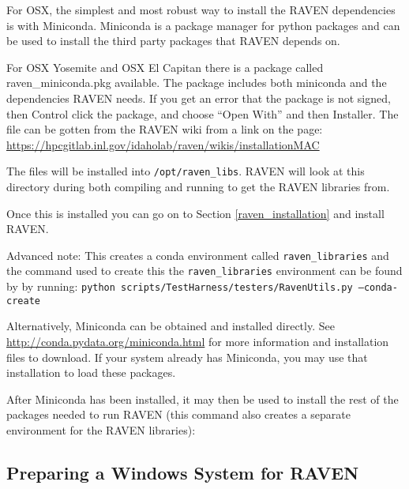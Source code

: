 For OSX, the simplest and most robust way to install the RAVEN
dependencies is with Miniconda.  Miniconda is a package manager for
python packages and can be used to install the third party packages
that RAVEN depends on.

For OSX Yosemite and OSX El Capitan there is a package called
raven\_miniconda.pkg available.  The package includes both miniconda
and the dependencies RAVEN needs. If you get an error that the package
is not signed, then Control click the package, and choose ``Open
With'' and then Installer.  The file can be gotten from the RAVEN wiki
from a link on the page:
\url{https://hpcgitlab.inl.gov/idaholab/raven/wikis/installationMAC}

The files will be installed into \texttt{/opt/raven\_libs}.  RAVEN
will look at this directory during both compiling and running to get
the RAVEN libraries from.


Once this is installed you can go on to Section \ref{raven_installation} and install RAVEN.

Advanced note: This creates a conda environment called
\texttt{raven\_libraries} and the command used to create this the \texttt{raven\_libraries} environment can be found by by running:
\texttt{python scripts/TestHarness/testers/RavenUtils.py --conda-create}

\label{miniconda_direct}

Alternatively, Miniconda can be obtained and installed directly. See
\url{http://conda.pydata.org/miniconda.html} for more information and
installation files to download.  If your system already has Miniconda,
you may use that installation to load these packages.

After Miniconda has been installed, it may then be used to install the
rest of the packages needed to run RAVEN (this command also creates a
separate environment for the RAVEN libraries):



\subsection{Preparing a Windows System for RAVEN}
\label{sysprep_windows}

